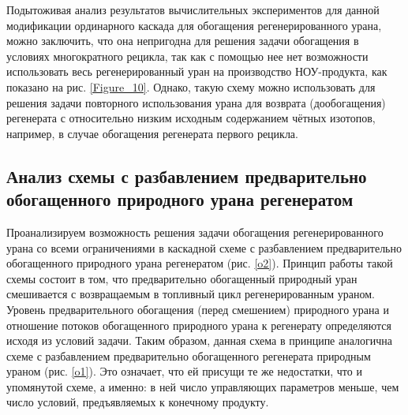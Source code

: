 

Подытоживая анализ результатов вычислительных экспериментов для данной модификации ординарного каскада для обогащения регенерированного урана, можно заключить, что она непригодна для решения задачи обогащения в условиях многократного рецикла, так как с помощью нее нет возможности использовать весь регенерированный уран на производство НОУ-продукта, как показано на рис. \ref{Figure_10}. Однако, такую схему можно использовать для решения задачи повторного использования урана для возврата (дообогащения) регенерата с относительно низким исходным содержанием чётных изотопов, например, в случае обогащения регенерата первого рецикла.


\subsection{Анализ схемы с разбавлением предварительно обогащенного природного урана регенератом}

Проанализируем возможность решения задачи обогащения регенерированного урана со всеми ограничениями в каскадной схеме с разбавлением предварительно обогащенного природного урана регенератом (рис. \ref{o2}). Принцип работы такой схемы состоит в том, что предварительно обогащенный природный уран смешивается с возвращаемым в топливный цикл регенерированным ураном. Уровень предварительного обогащения (перед смешением) природного урана и отношение потоков обогащенного природного урана к регенерату определяются исходя из условий задачи. Таким образом, данная схема в принципе аналогична схеме с разбавлением предварительно обогащенного регенерата природным ураном (рис. \ref{o1}). Это означает, что ей присущи те же недостатки, что и упомянутой схеме, а именно: в ней число управляющих параметров меньше, чем число условий, предъявляемых к конечному продукту. 

